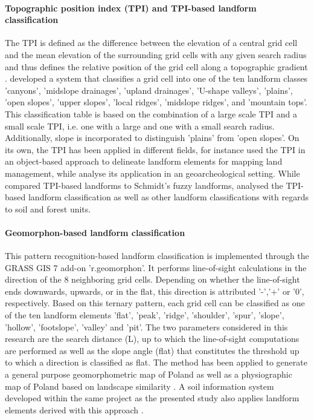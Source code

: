 \documentclass[preprint,12pt,authoryear]{elsarticle}
\begin{document}
\paragraph{Topographic position index (TPI) and TPI-based landform classification \citep{Weiss2000}}
The TPI is defined as the difference between the elevation of a central grid cell and the mean elevation of the surrounding grid cells with any given search radius and thus defines the relative position of the grid cell along a topographic gradient \citep{Guisan1999}. \cite{Weiss2000} developed a system that classifies a grid cell into one of the ten landform classes 'canyons', 'midslope drainages', 'upland drainages', 'U-shape valleys', 'plains', 'open slopes', 'upper slopes', 'local ridges', 'midslope ridges', and 'mountain tops'. This classification table is based on the combination of a large scale TPI and a small scale TPI, i.e. one with a large and one with a small search radius. Additionally, slope is incorporated to distinguish 'plains' from 'open slopes'.  On its own, the TPI has been applied in different fields, for instance \cite{Gercek2010} used the TPI in an object-based approach to delineate landform elements for mapping land management, while \cite{Reu2013} analyse its application in an geoarcheological setting. While \cite{Mokarram2015} compared TPI-based landforms to Schmidt's fuzzy landforms, \cite{Barka2011} analysed the TPI-based landform classification as well as other landform classifications with regards to  soil and forest units.
\paragraph{Geomorphon-based landform classification \citep{Jasiewicz2013}}
This pattern recognition-based landform classification is implemented through the GRASS GIS 7 add-on 'r.geomorphon'. It performs line-of-sight calculations in the direction of the 8 neighboring grid cells.  Depending on whether the line-of-sight ends downwards,  upwards, or in the flat, this direction is attributed '-','+' or '0', respectively.  Based on this ternary pattern, each grid cell can be classified as one of the ten landform elements 'flat', 'peak', 'ridge', 'shoulder', 'spur', 'slope', 'hollow', 'footslope', 'valley' and 'pit'. The two parameters considered in this research are the search distance (L), up to which the line-of-sight computations are performed as well as the slope angle (flat) that constitutes the threshold up to which a direction is classified as flat. The method has been applied to generate a general purpose geomorphometric map of Poland \citep{Jasiewicz2013} as well as a physiographic map of Poland based on landscape similarity \citep{Jasiewicz2014}. A soil information system developed within the same project as the presented study also applies landform elements derived with this approach \citep{Geitner2017}.
\end{document}
